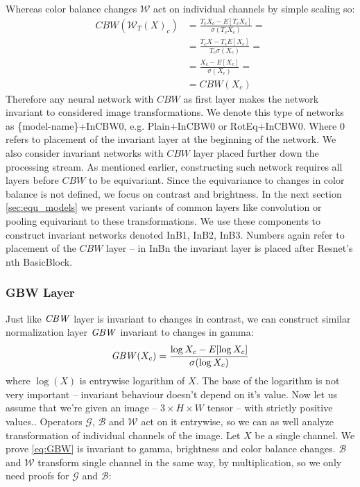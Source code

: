 Whereas color balance changes $\mathcal{W}$ act on individual channels by simple
scaling so:
\begin{align*}
    \mathit{CBW}(\mathcal{W}_T(X)_c) &=
    \frac{T_cX_c - E\left[T_cX_c\right]}{\sigma(T_cX_c)} = \\
    &= \frac{T_cX-T_cE[X_c]}{T_c\sigma(X_c)} = \\
    &= \frac{X_c-E[X_c]}{\sigma(X_c)} = \\
    &= \mathit{CBW}(X_c)
\end{align*}
Therefore any neural network with $\mathit{CBW}$ as first layer
makes the network invariant to considered image transformations.
We denote this type of networks as \{model-name\}+InCBW0, e.g. Plain+InCBW0 or
RotEq+InCBW0. Where 0 refers to placement of the invariant layer at the
beginning of the network. We also consider invariant networks with $\mathit{CBW}$
layer placed further down the processing stream. As mentioned earlier,
constructing such network requires all layers before $\mathit{CBW}$ to be
equivariant. Since the equivariance to changes in color balance is not defined,
we focus on contrast and brightness. In the next section \ref{sec:equ_models} we
present variants of common layers like convolution or pooling equivariant to
these transformations. We use these components to construct invariant networks
denoted InB1, InB2, InB3. Numbers again refer to
placement of the $\mathit{CBW}$ layer -- in InBn the invariant layer is placed
after Resnet's nth BasicBlock.

\subsubsection{GBW Layer}
Just like $\mathit{CBW}$ layer is invariant to changes in contrast,
we can construct similar normalization layer $\mathit{GBW}$ invariant to changes in
gamma:
\begin{equation}
    \mathit{GBW}(X_c) = \frac{\log{X_c}-E[\log{X_c}]}{\sigma(\log{X_c})}
    \label{eq:GBW}
\end{equation}
where $\log(X)$ is entrywise logarithm of $X$. The base of the
logarithm is not very important -- invariant behaviour doesn't depend on it's value.
Now let us assume that we're given an image -- $3\times H \times W$ tensor --
with strictly positive values..
Operators $\mathcal{G}$, $\mathcal{B}$ and $\mathcal{W}$ act on it entrywise, so
we can as well analyze transformation of individual channels of the image.
Let $X$ be a single channel.
We prove \ref{eq:GBW} is invariant to gamma, brightness and color balance
changes. $\mathcal{B}$ and $\mathcal{W}$ transform single channel in the same
way, by multiplication,
so we only need proofs for $\mathcal{G}$ and $\mathcal{B}$:

